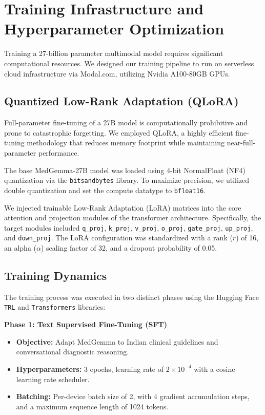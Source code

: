 \documentclass[11pt,a4paper]{article}
\begin{document}
\section{Training Infrastructure and Hyperparameter Optimization}

Training a 27-billion parameter multimodal model requires significant computational resources. We designed our training pipeline to run on serverless cloud infrastructure via Modal.com, utilizing Nvidia A100-80GB GPUs.

\subsection{Quantized Low-Rank Adaptation (QLoRA)}
Full-parameter fine-tuning of a 27B model is computationally prohibitive and prone to catastrophic forgetting. We employed QLoRA, a highly efficient fine-tuning methodology that reduces memory footprint while maintaining near-full-parameter performance. 

The base MedGemma-27B model was loaded using 4-bit NormalFloat (NF4) quantization via the \texttt{bitsandbytes} library. To maximize precision, we utilized double quantization and set the compute datatype to \texttt{bfloat16}. 

We injected trainable Low-Rank Adaptation (LoRA) matrices into the core attention and projection modules of the transformer architecture. Specifically, the target modules included \texttt{q\_proj}, \texttt{k\_proj}, \texttt{v\_proj}, \texttt{o\_proj}, \texttt{gate\_proj}, \texttt{up\_proj}, and \texttt{down\_proj}. The LoRA configuration was standardized with a rank ($r$) of 16, an alpha ($\alpha$) scaling factor of 32, and a dropout probability of 0.05.

\subsection{Training Dynamics}
The training process was executed in two distinct phases using the Hugging Face \texttt{TRL} and \texttt{Transformers} libraries:

\textbf{Phase 1: Text Supervised Fine-Tuning (SFT)}
\begin{itemize}
    \item \textbf{Objective:} Adapt MedGemma to Indian clinical guidelines and conversational diagnostic reasoning.
    \item \textbf{Hyperparameters:} 3 epochs, learning rate of $2\times 10^{-4}$ with a cosine learning rate scheduler.
    \item \textbf{Batching:} Per-device batch size of 2, with 4 gradient accumulation steps, and a maximum sequence length of 1024 tokens.
\end{itemize}
\end{document}
